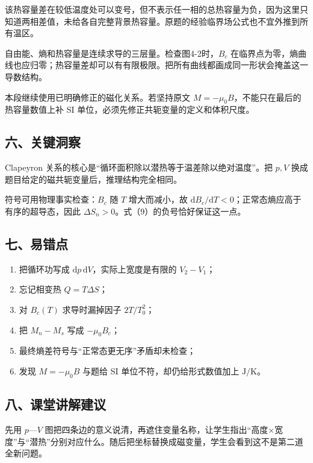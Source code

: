 \documentclass[12pt,a4paper,UTF8]{ctexart}
\newcommand{\tightlist}{\setlength{\itemsep}{0pt}\setlength{\parskip}{0pt}}
\begin{document}
该热容量差在较低温度处可以变号，但不表示任一相的总热容量为负，因为这里只知道两相差值，未给各自完整背景热容量。原题的经验临界场公式也不宜外推到所有温区。

自由能、熵和热容量是连续求导的三层量。检查图4-2时，\(B_c\)
在临界点为零，熵曲线也应归零；热容量差却可以有有限极限。把所有曲线都画成同一形状会掩盖这一导数结构。

本段继续使用已明确修正的磁化关系。若坚持原文
\(M=-\mu_0B\)，不能只在最后的热容量数值上补 SI
单位，必须先修正共轭变量的定义和体积尺度。

\subsection{六、关键洞察}\label{ux516dux5173ux952eux6d1eux5bdf-3}

Clapeyron 关系的核心是``循环面积除以潜热等于温差除以绝对温度''。把
\(p,V\) 换成题目给定的磁共轭变量后，推理结构完全相同。

符号可用物理事实检查：\(B_c\) 随 \(T\) 增大而减小，故
\(\mathrm dB_c/\mathrm dT<0\)；正常态熵应高于有序的超导态，因此
\(\Delta S_n>0\)。式（9）的负号恰好保证这一点。

\subsection{七、易错点}\label{ux4e03ux6613ux9519ux70b9-3}

\begin{enumerate}
\def\labelenumi{\arabic{enumi}.}
\tightlist
\item
  把循环功写成 \(\mathrm dp\,\mathrm dV\)，实际上宽度是有限的
  \(V_2-V_1\)；
\item
  忘记相变热 \(Q=T\Delta S\)；
\item
  对 \(B_c(T)\) 求导时漏掉因子 \(2T/T_0^2\)；
\item
  把 \(M_n-M_s\) 写成 \(-\mu_0B_c\)；
\item
  最终熵差符号与``正常态更无序''矛盾却未检查；
\item
  发现 \(M=-\mu_0B\) 与题给 SI 单位不符，却仍给形式数值加上
  \(\mathrm{J/K}\)。
\end{enumerate}

\subsection{八、课堂讲解建议}\label{ux516bux8bfeux5802ux8bb2ux89e3ux5efaux8bae-3}

先用 \(p\)---\(V\)
图把四条边的意义说清，再遮住变量名称，让学生指出``高度×宽度''与``潜热''分别对应什么。随后把坐标替换成磁变量，学生会看到这不是第二道全新问题。
\end{document}

